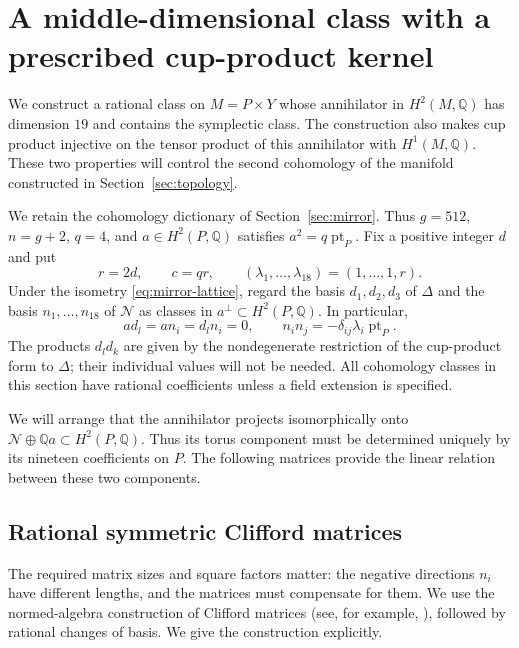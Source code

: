 \documentclass[11pt]{article}
\numberwithin{equation}{section}
\theoremstyle{definition}
\theoremstyle{remark}
\begin{document}
\section{A middle-dimensional class with a prescribed cup-product kernel}
\label{sec:clifford}

We construct a rational class on $M=P\times Y$ whose annihilator in
$H^2(M,\mathbb Q)$ has dimension $19$ and contains the symplectic class.
The construction also makes cup product injective on the tensor product
of this annihilator with $H^1(M,\mathbb Q)$.  These two properties will control
the second cohomology of the manifold constructed in
Section~\ref{sec:topology}.

We retain the cohomology dictionary of Section~\ref{sec:mirror}.
Thus $g=512$, $n=g+2$, $q=4$, and $a\in H^2(P,\mathbb Q)$ satisfies
$a^2=q\operatorname{pt}_P$.  Fix a positive integer $d$ and put
\[
 r=2d,\qquad c=qr,\qquad
 (\lambda_1,\ldots,\lambda_{18})=(1,\ldots,1,r).
\]
Under the isometry \eqref{eq:mirror-lattice}, regard the basis
$d_1,d_2,d_3$ of $\Delta$ and the basis $n_1,\ldots,n_{18}$ of
$\mathcal N$ as classes in $a^\perp\subset H^2(P,\mathbb Q)$.
In particular,
\begin{equation}\label{eq:clifford-P-pairings}
 a d_l=a n_i=d_l n_i=0,\qquad
 n_i n_j=-\delta_{ij}\lambda_i\operatorname{pt}_P.
\end{equation}
The products $d_l d_k$ are given by the nondegenerate restriction of
the cup-product form to $\Delta$; their individual values will not be
needed.  All cohomology classes in this section have rational
coefficients unless a field extension is specified.

We will arrange that the annihilator projects isomorphically onto
$\mathcal N\oplus\mathbb Q a\subset H^2(P,\mathbb Q)$.  Thus its torus component
must be determined uniquely by its nineteen coefficients on $P$.
The following matrices provide the linear relation between these two
components.

\subsection{Rational symmetric Clifford matrices}

The required matrix sizes and square factors matter: the negative
directions $n_i$ have different lengths, and the matrices must compensate
for them.  We use the normed-algebra construction of Clifford matrices
(see, for example, \cite[Sections~2.2--2.3]{Algebra:Baez}), followed by
rational changes of basis.  We give the construction explicitly.
\end{document}
